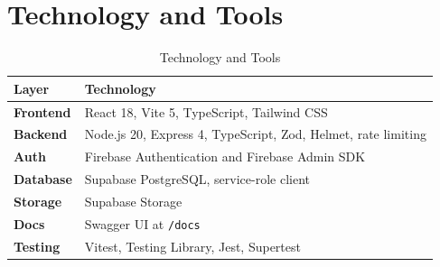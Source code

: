 \documentclass[12pt,a4paper]{report}
\begin{document}
\section{Technology and Tools}
\begin{table}[H]\centering\caption{Technology and Tools}\begin{tabularx}{\textwidth}{>{\bfseries}p{}X}\toprule Layer&Technology\\\midrule Frontend&React 18, Vite 5, TypeScript, Tailwind CSS\\Backend&Node.js 20, Express 4, TypeScript, Zod, Helmet, rate limiting\\Auth&Firebase Authentication and Firebase Admin SDK\\Database&Supabase PostgreSQL, service-role client\\Storage&Supabase Storage\\Docs&Swagger UI at \texttt{/docs}\\Testing&Vitest, Testing Library, Jest, Supertest\\\bottomrule\end{tabularx}\end{table}
\end{document}
